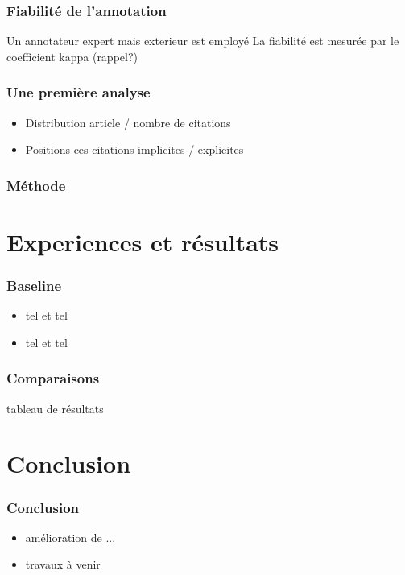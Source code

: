 \documentclass[12pt]{beamer}
\begin{document}
\begin{frame}
  \frametitle{Fiabilité de l'annotation}
  Un annotateur expert mais exterieur est employé
  La fiabilité est mesurée par le coefficient kappa (rappel?)
\end{frame}

\begin{frame}
  \frametitle{Une première analyse}
  \begin{itemize}
    \item Distribution article / nombre de citations
    \item Positions ces citations implicites / explicites
  \end{itemize}
\end{frame}

\begin{frame}
  \frametitle{Méthode}
\end{frame}

\section{Experiences et résultats}
\begin{frame}
  \frametitle{Baseline}

  \begin{itemize}
    \item tel et tel
    \item tel et tel
  \end{itemize}
\end{frame}

\begin{frame}
  \frametitle{Comparaisons}
  tableau de résultats
\end{frame}

\section{Conclusion}
\begin{frame}
  \frametitle{Conclusion}

  \begin{itemize}
    \item amélioration de ...
    \item travaux à venir
  \end{itemize}
\end{frame}
\end{document}
